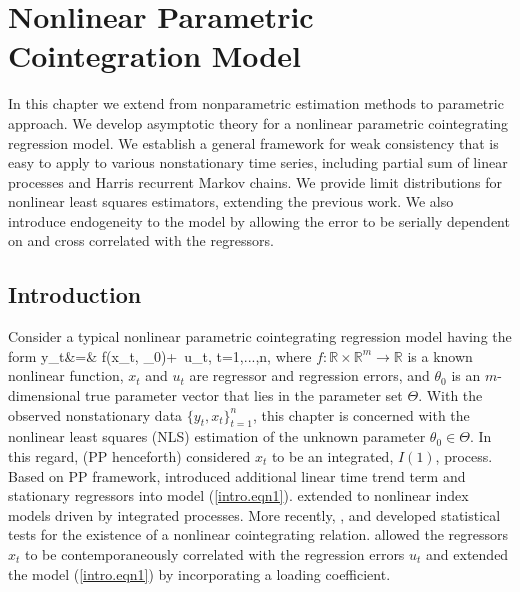 
\chapter{Nonlinear Parametric Cointegration Model} 
\ifpdf
    \graphicspath{{Chapter6/Chapter6Figs/PNG/}{Chapter6/Chapter6Figs/PDF/}{Chapter6/Chapter6Figs/}}
\else
    \graphicspath{{Chapter6/Chapter6Figs/EPS/}{Chapter6/Chapter6Figs/}}
\fi

 In this chapter we extend from nonparametric estimation methods to parametric approach. We develop asymptotic theory for a nonlinear parametric cointegrating regression model. We establish a general framework for  weak consistency that is easy to apply to various nonstationary time series, including partial sum of linear processes and  Harris recurrent Markov chains. We provide  limit distributions for  nonlinear least squares  estimators,    extending the previous work.  We also introduce endogeneity to the model by allowing the error to be serially dependent on and cross correlated with the regressors.



\section{Introduction} 
Consider a typical nonlinear parametric cointegrating regression model having the form
 \be y_t&=&
f(x_t, \theta_0)+\,  u_t, \quad t=1,...,n,
\ee
where  $f:\mathbb{R} \times \mathbb{R}^m \rightarrow \mathbb{R}$ is a known nonlinear function,
$x_t$ and  $u_t$ are regressor and regression errors, and   $\theta_0$ is an $m$-dimensional true parameter vector that lies in the parameter set $\Theta$. With the observed nonstationary data $\{y_t, x_t\}_{t=1}^n$, this chapter is concerned with the nonlinear least squares (NLS) estimation of the unknown parameter $\theta_0 \in \Theta$. In this regard, \cite{parkphillips2001} (PP henceforth) considered $x_t$ to be an integrated, $I(1)$, process. Based on PP framework, \cite{changparkphillips2001} introduced additional linear time trend term and stationary regressors into model (\ref{intro.eqn1}). \cite{changpark2003} extended to nonlinear index models driven by integrated processes.  More recently, \cite{choisaikkonen2010}, \cite{gaomaxwelllutjostheim2009b} and \cite{wangphillips2012} developed statistical tests  for the existence of a nonlinear cointegrating relation. \cite{changpark2010} allowed the regressors $x_t$ to be contemporaneously correlated with the regression errors $u_t$ and \cite{shiphillips2010} extended the model (\ref{intro.eqn1}) by incorporating a loading coefficient.


